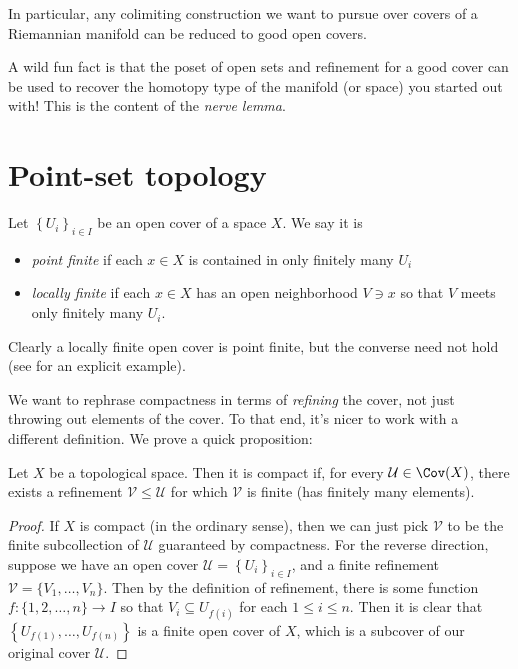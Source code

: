 \documentclass[11pt]{book}
\begin{document}
In particular, any colimiting construction we want to pursue over covers of a Riemannian manifold can be reduced to good open covers.

A wild fun fact is that the poset of open sets and refinement for a good cover can be used to recover the homotopy type of the manifold (or space) you started out with! This is the content of the \emph{nerve lemma}.


\section{Point-set topology}

\begin{definition}\label{def:point-finite-versus-locally-finite} Let $\left\{ U_i \right\}_{i\in I}$ be an open cover of a space $X$. We say it is
\begin{itemize}
    \item \emph{point finite} if each $x\in X$ is contained in only finitely many $U_i$
    \item \emph{locally finite} if each $x\in X$ has an open neighborhood $V\ni x$ so that $V$ meets only finitely many $U_i$.
\end{itemize}
Clearly a locally finite open cover is point finite, but the converse need not hold (see \cite[p.~244]{Munkres} for an explicit example).
\end{definition}

We want to rephrase compactness in terms of \emph{refining} the cover, not just throwing out elements of the cover. To that end, it's nicer to work with a different definition. We prove a quick proposition:

\begin{proposition}\label{prop:new-def-of-compactness} Let $X$ be a topological space. Then it is compact if, for every $\mathcal{U}\in \Cov(X)$, there exists a refinement $\mathcal{V} \le \mathcal{U}$ for which $\mathcal{V}$ is finite (has finitely many elements).
\end{proposition}
\begin{proof} If $X$ is compact (in the ordinary sense), then we can just pick $\mathcal{V}$ to be the finite subcollection of $\mathcal{U}$ guaranteed by compactness. For the reverse direction, suppose we have an open cover $\mathcal{U} = \left\{ U_i \right\}_{i\in I}$, and a finite refinement $\mathcal{V} =\{V_1, \ldots, V_n\}$. Then by the definition of refinement, there is some function $f \colon \{1,2, \ldots, n\} \to I$ so that $V_i \subseteq U_{f(i)}$ for each $1\le i\le n$. Then it is clear that $\left\{ U_{f(1)}, \ldots, U_{f(n)} \right\}$ is a finite open cover of $X$, which is a subcover of our original cover $\mathcal{U}$.
\end{proof}
\end{document}
